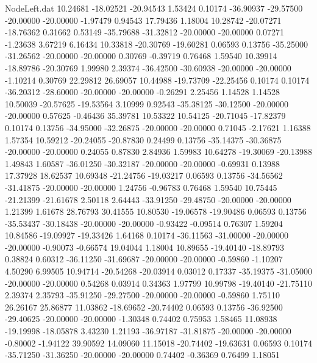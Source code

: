 \begin{filecontents}{NodeLeft.dat}
  10.24681  -18.02521  -20.94543     1.53424    0.10174  -36.90937  -29.57500  -20.00000  -20.00000   -1.97479    0.94543   17.79436    1.18004
  10.28742  -20.07271  -18.76362     0.31662    0.53149  -35.79688  -31.32812  -20.00000  -20.00000    0.07271   -1.23638    3.67219    6.16434
  10.33818  -20.30769  -19.60281     0.06593    0.13756  -35.25000  -31.26562  -20.00000  -20.00000    0.30769   -0.39719    0.76468    1.59540
  10.39914  -18.89786  -20.30769     1.99980    2.39374  -36.42500  -30.60938  -20.00000  -20.00000   -1.10214    0.30769   22.29812   26.69057
  10.44988  -19.73709  -22.25456     0.10174    0.10174  -36.20312  -28.60000  -20.00000  -20.00000   -0.26291    2.25456    1.14528    1.14528
  10.50039  -20.57625  -19.53564     3.10999    0.92543  -35.38125  -30.12500  -20.00000  -20.00000    0.57625   -0.46436   35.39781   10.53322
  10.54125  -20.71045  -17.82379     0.10174    0.13756  -34.95000  -32.26875  -20.00000  -20.00000    0.71045   -2.17621    1.16388    1.57354
  10.59212  -20.24055  -20.87830     0.24499    0.13756  -35.14375  -30.36875  -20.00000  -20.00000    0.24055    0.87830    2.84936    1.59983
  10.64278  -19.30069  -20.13988     1.49843    1.60587  -36.01250  -30.32187  -20.00000  -20.00000   -0.69931    0.13988   17.37928   18.62537
  10.69348  -21.24756  -19.03217     0.06593    0.13756  -34.56562  -31.41875  -20.00000  -20.00000    1.24756   -0.96783    0.76468    1.59540
  10.75445  -21.21399  -21.61678     2.50118    2.64443  -33.91250  -29.48750  -20.00000  -20.00000    1.21399    1.61678   28.76793   30.41555
  10.80530  -19.06578  -19.90486     0.06593    0.13756  -35.53437  -30.18438  -20.00000  -20.00000   -0.93422   -0.09514    0.76307    1.59204
  10.84586  -19.09927  -19.33426     1.64168    0.10174  -36.11563  -31.00000  -20.00000  -20.00000   -0.90073   -0.66574   19.04044    1.18004
  10.89655  -19.40140  -18.89793     0.38824    0.60312  -36.11250  -31.69687  -20.00000  -20.00000   -0.59860   -1.10207    4.50290    6.99505
  10.94714  -20.54268  -20.03914     0.03012    0.17337  -35.19375  -31.05000  -20.00000  -20.00000    0.54268    0.03914    0.34363    1.97799
  10.99798  -19.40140  -21.75110     2.39374    2.35793  -35.91250  -29.27500  -20.00000  -20.00000   -0.59860    1.75110   26.26167   25.86877
  11.03862  -18.69652  -20.74402     0.06593    0.13756  -36.92500  -29.40625  -20.00000  -20.00000   -1.30348    0.74402    0.75953    1.58465
  11.08938  -19.19998  -18.05878     3.43230    1.21193  -36.97187  -31.81875  -20.00000  -20.00000   -0.80002   -1.94122   39.90592   14.09060
  11.15018  -20.74402  -19.63631     0.06593    0.10174  -35.71250  -31.36250  -20.00000  -20.00000    0.74402   -0.36369    0.76499    1.18051

\end{filecontents}
